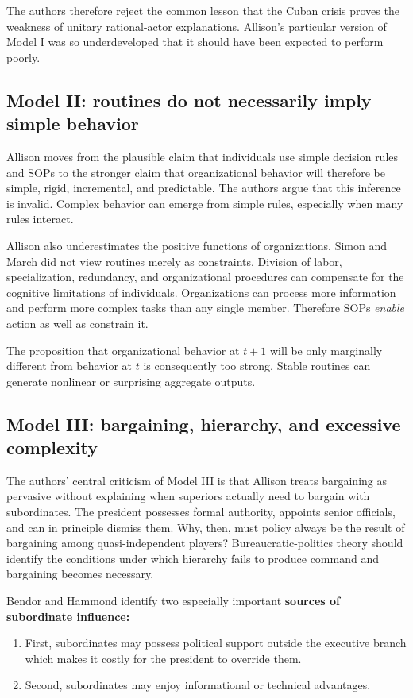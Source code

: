 The authors therefore reject the common lesson that the Cuban crisis proves the weakness of unitary rational-actor explanations. Allison's particular version of Model I was so underdeveloped that it should have been expected to perform poorly.

\subsection{Model II: routines do not necessarily imply simple behavior}
Allison moves from the plausible claim that individuals use simple decision rules and SOPs to the stronger claim that organizational behavior will therefore be simple, rigid, incremental, and predictable. The authors argue that this inference is invalid. Complex behavior can emerge from simple rules, especially when many rules interact.

Allison also underestimates the positive functions of organizations. Simon and March did not view routines merely as constraints. Division of labor, specialization, redundancy, and organizational procedures can compensate for the cognitive limitations of individuals. Organizations can process more information and perform more complex tasks than any single member. Therefore SOPs \emph{enable} action as well as constrain it.

The proposition that organizational behavior at $t+1$ will be only marginally different from behavior at $t$ is consequently too strong. Stable routines can generate nonlinear or surprising aggregate outputs.

\subsection{Model III: bargaining, hierarchy, and excessive complexity}

The authors' central criticism of Model III is that Allison treats bargaining as pervasive without explaining when superiors actually need to bargain with subordinates. The president possesses formal authority, appoints senior officials, and can in principle dismiss them. Why, then, must policy always be the result of bargaining among quasi-independent players? Bureaucratic-politics theory should identify the conditions under which hierarchy fails to produce command and bargaining becomes necessary.

Bendor and Hammond identify two especially important \textbf{sources of subordinate influence:}
\begin{enumerate}
    \item First, subordinates may possess political support outside the executive branch which makes it costly for the president to override them.
    \item Second, subordinates may enjoy informational or technical advantages.
\end{enumerate}

